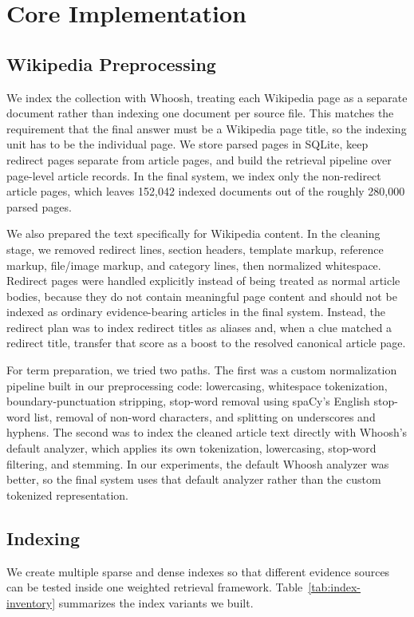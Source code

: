 \documentclass[11pt]{article}
\begin{document}
\section{Core Implementation}

\subsection{Wikipedia Preprocessing}

We index the collection with Whoosh, treating each Wikipedia page as a separate document rather than indexing one document per source file. This matches the requirement that the final answer must be a Wikipedia page title, so the indexing unit has to be the individual page. We store parsed pages in SQLite, keep redirect pages separate from article pages, and build the retrieval pipeline over page-level article records. In the final system, we index only the non-redirect article pages, which leaves 152,042 indexed documents out of the roughly 280,000 parsed pages.

We also prepared the text specifically for Wikipedia content. In the cleaning stage, we removed redirect lines, section headers, template markup, reference markup, file/image markup, and category lines, then normalized whitespace. Redirect pages were handled explicitly instead of being treated as normal article bodies, because they do not contain meaningful page content and should not be indexed as ordinary evidence-bearing articles in the final system. Instead, the redirect plan was to index redirect titles as aliases and, when a clue matched a redirect title, transfer that score as a boost to the resolved canonical article page.

For term preparation, we tried two paths. The first was a custom normalization pipeline built in our preprocessing code: lowercasing, whitespace tokenization, boundary-punctuation stripping, stop-word removal using spaCy's English stop-word list, removal of non-word characters, and splitting on underscores and hyphens. The second was to index the cleaned article text directly with Whoosh's default analyzer, which applies its own tokenization, lowercasing, stop-word filtering, and stemming. In our experiments, the default Whoosh analyzer was better, so the final system uses that default analyzer rather than the custom tokenized representation.

\subsection{Indexing}
We create multiple sparse and dense indexes so that different evidence sources can be tested inside one weighted retrieval framework. Table~\ref{tab:index-inventory} summarizes the index variants we built.
\end{document}
